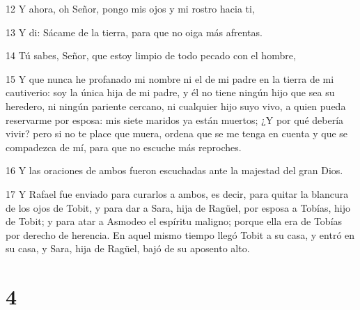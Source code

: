 \par 12 Y ahora, oh Señor, pongo mis ojos y mi rostro hacia ti,
\par 13 Y di: Sácame de la tierra, para que no oiga más afrentas.
\par 14 Tú sabes, Señor, que estoy limpio de todo pecado con el hombre,
\par 15 Y que nunca he profanado mi nombre ni el de mi padre en la tierra de mi cautiverio: soy la única hija de mi padre, y él no tiene ningún hijo que sea su heredero, ni ningún pariente cercano, ni cualquier hijo suyo vivo, a quien pueda reservarme por esposa: mis siete maridos ya están muertos; ¿Y por qué debería vivir? pero si no te place que muera, ordena que se me tenga en cuenta y que se compadezca de mí, para que no escuche más reproches.
\par 16 Y las oraciones de ambos fueron escuchadas ante la majestad del gran Dios.
\par 17 Y Rafael fue enviado para curarlos a ambos, es decir, para quitar la blancura de los ojos de Tobit, y para dar a Sara, hija de Ragüel, por esposa a Tobías, hijo de Tobit; y para atar a Asmodeo el espíritu maligno; porque ella era de Tobías por derecho de herencia. En aquel mismo tiempo llegó Tobit a su casa, y entró en su casa, y Sara, hija de Ragüel, bajó de su aposento alto.

\chapter{4}

